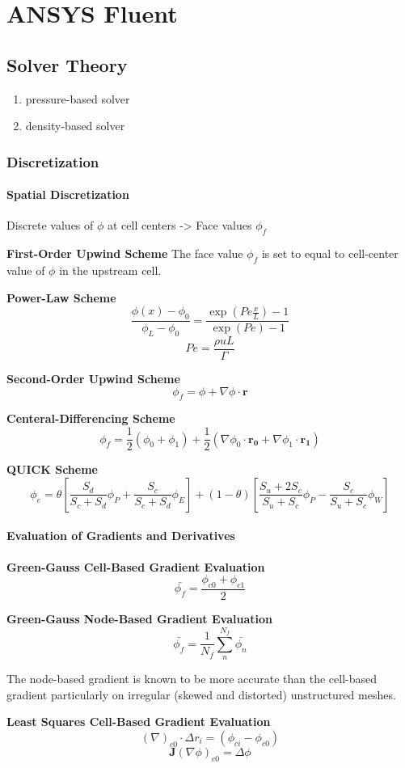 \chapter{ANSYS Fluent}

\section{Solver Theory}

\begin{enumerate}
  \item pressure-based solver
  \item density-based solver
\end{enumerate}

\subsection{Discretization}
\subsubsection{Spatial Discretization}
Discrete values of $\phi$ at cell centers -> Face values $\phi_f$

\textbf{First-Order Upwind Scheme}
The face value $\phi_f$ is set to equal to cell-center value of $\phi$ in the upstream cell.

\textbf{Power-Law Scheme}
$$\frac{\phi(x)-\phi_0}{\phi_L-\phi_0}=\frac{\exp \left( Pe \frac{x}{L}\right)-1}{\exp \left( Pe \right)-1}$$
$$Pe=\frac{\rho u L}{\Gamma}$$

\textbf{Second-Order Upwind Scheme}
\[
\phi_f = \phi + \nabla \phi \cdot \mathbf{r}
\]

\textbf{Centeral-Differencing Scheme}
\[
\phi_f = \frac{1}{2} \left( \phi_0 + \phi_1 \right) + 
\frac{1}{2} \left( \nabla \phi_0 \cdot \mathbf{r_0} + \nabla \phi_1 \cdot \mathbf{r_1} \right)
\]

\textbf{QUICK Scheme}
\[
\phi_e = \theta \left[ \frac{S_d}{S_c+S_d} \phi_P + \frac{S_c}{S_c + S_d} \phi_E \right] +
(1-\theta) \left[ \frac{S_u+2S_c}{S_u+S_c} \phi_P - \frac{S_c}{S_u+S_c} \phi_W \right]
\]

\subsubsection{Evaluation of Gradients and Derivatives}
\textbf{Green-Gauss Cell-Based Gradient Evaluation}
\[
\bar{\phi_f} = \frac{\phi_{c0} + \phi_{c1}}{2}
\]

\textbf{Green-Gauss Node-Based Gradient Evaluation}
\[
\bar{\phi_f} = \frac{1}{N_f} \sum_n^{N_f} \bar{\phi_n}
\]

The node-based gradient is known to be more accurate than the cell-based gradient particularly on irregular
(skewed and distorted) unstructured meshes.

\textbf{Least Squares Cell-Based Gradient Evaluation}
\[
\left( \nabla \right)_{c0} \cdot \Delta r_i = \left( \phi_{ci} - \phi_{c0} \right)
\]
\[
\mathbf{J} \left( \nabla \phi \right)_{c0} = \Delta \phi
\]


